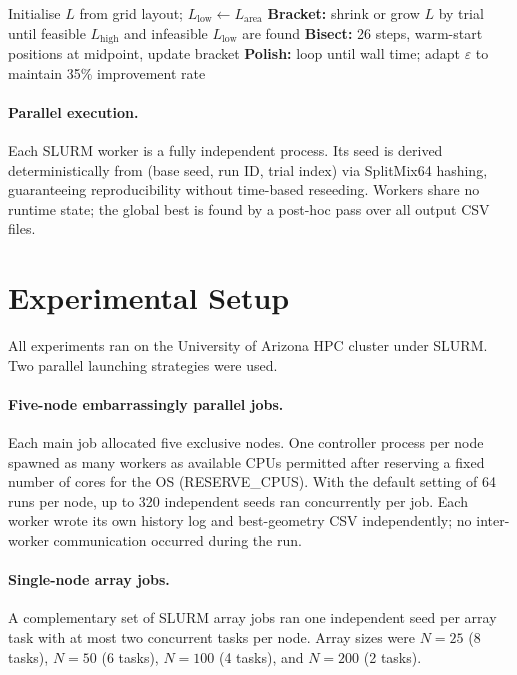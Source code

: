 \documentclass[10pt,twocolumn]{article}
\begin{document}
\begin{algorithm}[H]
\caption{Outer minimisation loop}
\label{alg:outer}
\small
\begin{algorithmic}[1]
\State Initialise $L$ from grid layout;\; $L_{\mathrm{low}}
       \leftarrow L_{\mathrm{area}}$
\State \textbf{Bracket:} shrink or grow $L$ by trial until feasible
       $L_{\mathrm{high}}$ and infeasible $L_{\mathrm{low}}$ are found
\State \textbf{Bisect:} 26 steps, warm-start positions at midpoint,
       update bracket
\State \textbf{Polish:} loop until wall time; adapt $\varepsilon$
       to maintain 35\% improvement rate
\end{algorithmic}
\end{algorithm}

\paragraph{Parallel execution.}
Each SLURM worker is a fully independent process. Its seed is derived
deterministically from (base seed, run ID, trial index) via SplitMix64
hashing, guaranteeing reproducibility without time-based reseeding.
Workers share no runtime state; the global best is found by a
post-hoc pass over all output CSV files.

\section{Experimental Setup}
\label{sec:experiments}

All experiments ran on the University of Arizona HPC cluster under
SLURM. Two parallel launching strategies were used.

\paragraph{Five-node embarrassingly parallel jobs.}
Each main job allocated five exclusive nodes. One controller process
per node spawned as many workers as available CPUs permitted after
reserving a fixed number of cores for the OS (RESERVE\_CPUS). With the
default setting of 64 runs per node, up to 320 independent seeds ran
concurrently per job. Each worker wrote its own history log and
best-geometry CSV independently; no inter-worker communication occurred
during the run.

\paragraph{Single-node array jobs.}
A complementary set of SLURM array jobs ran one independent seed per
array task with at most two concurrent tasks per node. Array sizes
were $N=25$ (8 tasks), $N=50$ (6 tasks), $N=100$ (4 tasks), and
$N=200$ (2 tasks).
\end{document}
